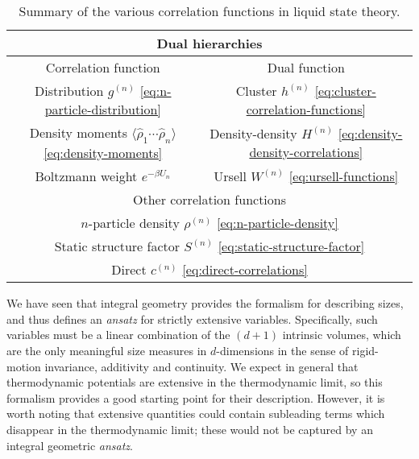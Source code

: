 \documentclass[11pt,twoside]{report}
\begin{document}
\begin{SCtable}
  \begin{minipage}[b]{\linewidth}
    \centering
    \begin{tabular}{cc}
      \toprule
      \multicolumn{2}{c}{Dual hierarchies} \\
      \midrule
      Correlation function & Dual function \\
      \midrule
      Distribution $g^{(n)}$ \eqref{eq:n-particle-distribution} &
      Cluster $h^{(n)}$ \eqref{eq:cluster-correlation-functions} \\
      Density moments $\langle \widehat{\rho}_1 \cdots \widehat{\rho}_n \rangle$ \eqref{eq:density-moments} &
      Density-density $H^{(n)}$ \eqref{eq:density-density-correlations} \\
      Boltzmann weight $e^{-\beta U_n}$ &
      Ursell $W^{(n)}$ \eqref{eq:ursell-functions} \\
      \midrule
      \multicolumn{2}{c}{Other correlation functions} \\
      \midrule
      \multicolumn{2}{c}{$n$-particle density $\rho^{(n)}$ \eqref{eq:n-particle-density}} \\
      \multicolumn{2}{c}{Static structure factor $S^{(n)}$ \eqref{eq:static-structure-factor}} \\
      \multicolumn{2}{c}{Direct $c^{(n)}$ \eqref{eq:direct-correlations}} \\
      \bottomrule
    \end{tabular}
  \end{minipage}
  \caption{Summary of the various correlation functions in liquid state theory.}
  \label{table:correlation-functions}
\end{SCtable}

We have seen that integral geometry provides the formalism for describing sizes, and thus defines an \emph{ansatz} for strictly extensive variables.
Specifically, such variables must be a linear combination of the $(d+1)$ intrinsic volumes, which are the only meaningful size measures in $d$-dimensions in the sense of rigid-motion invariance, additivity and continuity.
We expect in general that thermodynamic potentials are extensive in the thermodynamic limit, so this formalism provides a good starting point for their description.
However, it is worth noting that extensive quantities could contain subleading terms which disappear in the thermodynamic limit; these would not be captured by an integral geometric \emph{ansatz}.
\end{document}
